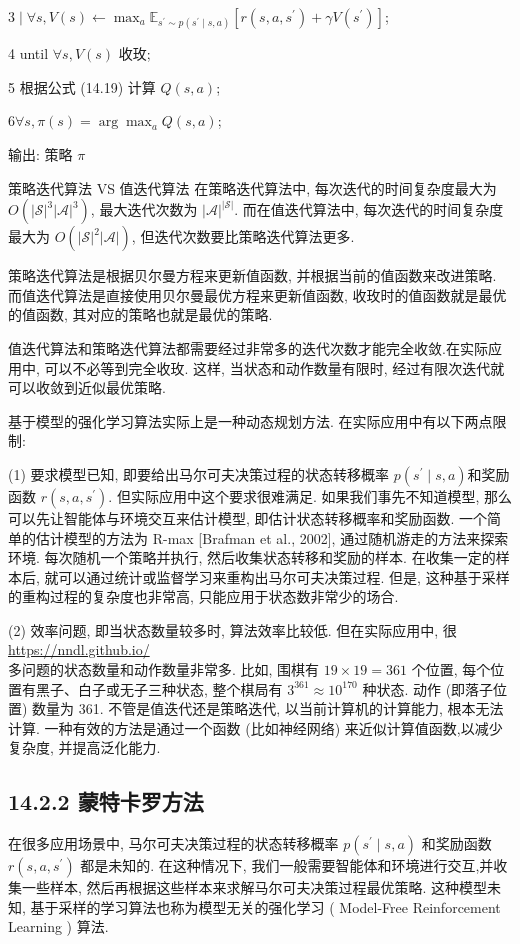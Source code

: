 \documentclass[10pt]{article}
\begin{document}
$3 \mid \forall s, V(s) \leftarrow \max _{a} \mathbb{E}_{s^{\prime} \sim p\left(s^{\prime} \mid s, a\right)}\left[r\left(s, a, s^{\prime}\right)+\gamma V\left(s^{\prime}\right)\right]$;

4 until $\forall s, V(s)$ 收玫;

5 根据公式 (14.19) 计算 $Q(s, a)$;

$6 \forall s, \pi(s)=\arg \max _{a} Q(s, a)$;

输出: 策略 $\pi$

策略迭代算法 VS 值迭代算法 在策略迭代算法中, 每次迭代的时间复杂度最大为 $O\left(|\mathcal{S}|^{3}|\mathcal{A}|^{3}\right)$, 最大迭代次数为 $|\mathcal{A}|^{|\mathcal{S}|}$. 而在值迭代算法中, 每次迭代的时间复杂度最大为 $O\left(|\mathcal{S}|^{2}|\mathcal{A}|\right)$, 但迭代次数要比策略迭代算法更多.

策略迭代算法是根据贝尔曼方程来更新值函数, 并根据当前的值函数来改进策略. 而值迭代算法是直接使用贝尔曼最优方程来更新值函数, 收玫时的值函数就是最优的值函数, 其对应的策略也就是最优的策略.

值迭代算法和策略迭代算法都需要经过非常多的迭代次数才能完全收敛.在实际应用中, 可以不必等到完全收玫. 这样, 当状态和动作数量有限时, 经过有限次迭代就可以收敛到近似最优策略.

基于模型的强化学习算法实际上是一种动态规划方法. 在实际应用中有以下两点限制:

(1) 要求模型已知, 即要给出马尔可夫决策过程的状态转移概率 $p\left(s^{\prime} \mid s, a\right)$和奖励函数 $r\left(s, a, s^{\prime}\right)$. 但实际应用中这个要求很难满足. 如果我们事先不知道模型, 那么可以先让智能体与环境交互来估计模型, 即估计状态转移概率和奖励函数. 一个简单的估计模型的方法为 R-max [Brafman et al., 2002], 通过随机游走的方法来探索环境. 每次随机一个策略并执行, 然后收集状态转移和奖励的样本. 在收集一定的样本后, 就可以通过统计或监督学习来重构出马尔可夫决策过程. 但是, 这种基于采样的重构过程的复杂度也非常高, 只能应用于状态数非常少的场合.

(2) 效率问题, 即当状态数量较多时, 算法效率比较低. 但在实际应用中, 很 \href{https://nndl.github.io/}{https://nndl.github.io/}\\
多问题的状态数量和动作数量非常多. 比如, 围棋有 $19 \times 19=361$ 个位置, 每个位置有黑子、白子或无子三种状态, 整个棋局有 $3^{361} \approx 10^{170}$ 种状态. 动作 (即落子位置) 数量为 361. 不管是值迭代还是策略迭代, 以当前计算机的计算能力, 根本无法计算. 一种有效的方法是通过一个函数 (比如神经网络) 来近似计算值函数,以减少复杂度, 并提高泛化能力.

\subsection*{14.2.2 蒙特卡罗方法}
在很多应用场景中, 马尔可夫决策过程的状态转移概率 $p\left(s^{\prime} \mid s, a\right)$ 和奖励函数 $r\left(s, a, s^{\prime}\right)$ 都是未知的. 在这种情况下, 我们一般需要智能体和环境进行交互,并收集一些样本, 然后再根据这些样本来求解马尔可夫决策过程最优策略. 这种模型未知, 基于采样的学习算法也称为模型无关的强化学习 ( Model-Free Reinforcement Learning ) 算法.
\end{document}

